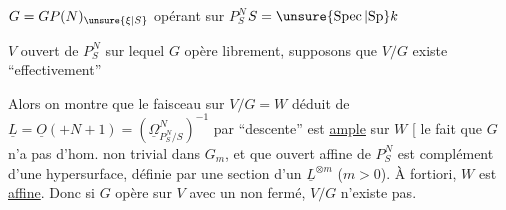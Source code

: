 $G=GP(N)_{\unsure{\xi|S}}$ opérant sur $P^N_S$\qquad $S=\unsure{\operatorname{Spec}|\mathrm{Sp}}k$

$V$ ouvert de $P^N_S$ sur lequel $G$ opère librement, supposons que $V/G$ existe ``effectivement''

Alors on montre que le faisceau sur $V/G=W$ déduit de $\underline{L}=\underline{O}(+N+1)=(\underline{\Omega}^N_{P^N_S/S})^{-1}$ par ``descente'' est \uline{ample} sur $W$ [ le fait que $G$ n'a pas d'hom. non trivial dans $G_m$, et que  ouvert affine de $P^N_S$ est complément d'une hypersurface,  définie par une section d'un $\underline{L}^{\otimes m}$ ($m>0$). À fortiori, $W$ est \uline{affine}. Donc si $G$ opère  sur $V$ avec un  non fermé, $V/G$ n'existe pas.

